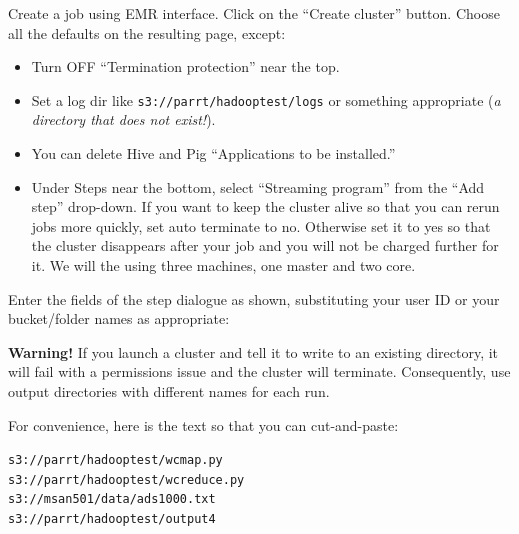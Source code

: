 \begin{fullwidth}
\step Create a job using EMR interface. Click on the ``Create cluster'' button. Choose all the defaults on the resulting page, except:

\begin{itemize}
\item Turn OFF ``Termination protection'' near the top.
\item Set a log dir like {\tt s3://parrt/hadooptest/logs} or something appropriate ({\em a directory that does not exist!}).
\item You can delete Hive and Pig ``Applications to be installed.''
\item Under Steps near the bottom, select ``Streaming program'' from the ``Add step'' drop-down. If you want to keep the cluster alive so that you can rerun jobs more quickly, set auto terminate to no. Otherwise set it to yes so that the cluster disappears after your job and you will not be charged further for it. We will the using three machines, one master and two core.
\end{itemize}

\step Enter the fields of the step dialogue as shown, substituting your user ID or your bucket/folder names as appropriate:

\noindent{}

{\bf Warning!} If you launch a cluster and tell it to write to an existing directory, it will fail with a permissions issue and the cluster will terminate.  Consequently, use output directories with different names for each run.

For convenience, here is the text so that you can cut-and-paste:

\begin{alltt}\small
s3://parrt/hadooptest/wcmap.py
s3://parrt/hadooptest/wcreduce.py
s3://msan501/data/ads1000.txt
s3://parrt/hadooptest/output4
\end{alltt}


\end{fullwidth}
